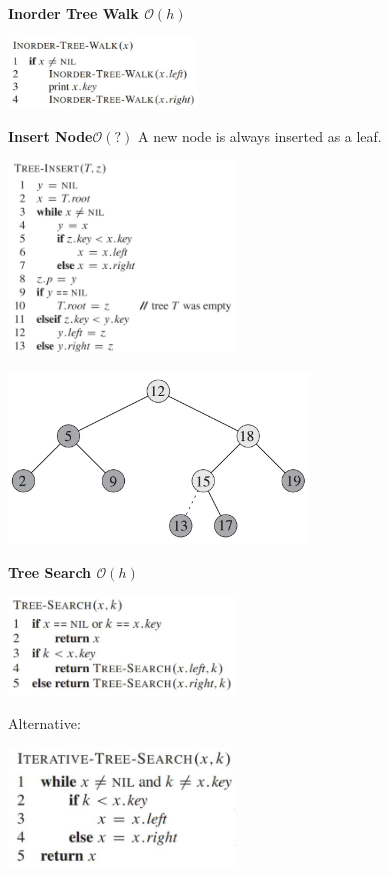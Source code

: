 \documentclass[10pt,a4paper,twocolumn]{article}
\begin{document}
\textbf{Inorder Tree Walk $\mathcal{O}(h)$}
\begin{center}
	\includegraphics[width=5cm]{images/inorder-tree-walk}
\end{center}

\textbf{Insert Node$\mathcal{O}(?)$}
A new node is always inserted as a leaf.
\begin{center}
	\includegraphics[width=6cm]{images/tree-insert}
\end{center}
\begin{center}
	\includegraphics[width=8cm]{images/example-insert-tree}
\end{center}

\textbf{Tree Search $\mathcal{O}(h)$}
\begin{center}
	\includegraphics[width=6cm]{images/tree-search}
\end{center}
Alternative:
\begin{center}
	\includegraphics[width=6cm]{images/tree-search2}
\end{center}
\end{document}
